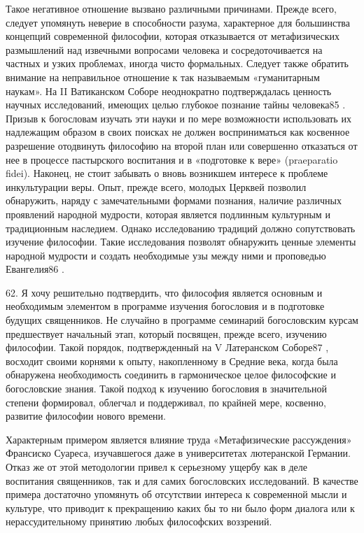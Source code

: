 \documentclass[a5paper,10pt]{article}
\begin{document}
Такое негативное отношение вызвано различными причинами. Прежде всего, следует
упомянуть неверие в способности разума, характерное для большинства концепций
современной философии, которая отказывается от метафизических размышлений над
извечными вопросами человека и сосредоточивается на частных и узких проблемах,
иногда чисто формальных. Следует также обратить внимание на неправильное
отношение к так называемым «гуманитарным наукам». На II Ватиканском Соборе
неоднократно подтверждалась ценность научных исследований, имеющих целью
глубокое познание тайны человека85 . Призыв к богословам изучать эти науки и по
мере возможности использовать их надлежащим образом в своих поисках не должен
восприниматься как косвенное разрешение отодвинуть философию на второй план или
совершенно отказаться от нее в процессе пастырского воспитания и в «подготовке
к вере» (praeparatio fidei). Наконец, не стоит забывать о вновь возникшем
интересе к проблеме инкультурации веры. Опыт, прежде всего, молодых Церквей
позволил обнаружить, наряду с замечательными формами познания, наличие
различных проявлений народной мудрости, которая является подлинным культурным и
традиционным наследием. Однако исследованию традиций должно сопутствовать
изучение философии. Такие исследования позволят обнаружить ценные элементы
народной мудрости и создать необходимые узы между ними и проповедью Евангелия86
.

62. Я хочу решительно подтвердить, что философия является основным и
необходимым элементом в программе изучения богословия и в подготовке будущих
священников. Не случайно в программе семинарий богословским курсам предшествует
начальный этап, который посвящен, прежде всего, изучению философии. Такой
порядок, подтвержденный на V Латеранском Соборе87 , восходит своими корнями к
опыту, накопленному в Средние века, когда была обнаружена необходимость
соединить в гармоническое целое философские и богословские знания. Такой подход
к изучению богословия в значительной степени формировал, облегчал и
поддерживал, по крайней мере, косвенно, развитие философии нового времени.

Характерным примером является влияние труда «Метафизические рассуждения»
Франсиско Суареса, изучавшегося даже в университетах лютеранской Германии.
Отказ же от этой методологии привел к серьезному ущербу как в деле воспитания
священников, так и для самих богословских исследований. В качестве примера
достаточно упомянуть об отсутствии интереса к современной мысли и культуре, что
приводит к прекращению каких бы то ни было форм диалога или к нерассудительному
принятию любых философских воззрений.
\end{document}
